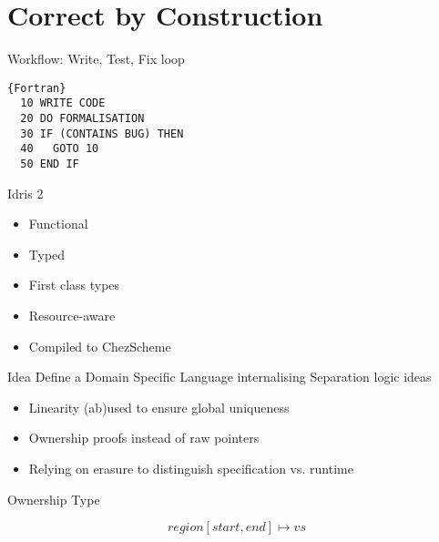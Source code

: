 \section{Correct by Construction}

\newcommand{\mathidris}[1]{{\bf{\mathtt{#1}}}}

\begin{frame}[fragile]{Workflow: Write, Test, Fix loop}

\begin{lstlisting}{Fortran}
  10 WRITE CODE
  20 DO FORMALISATION
  30 IF (CONTAINS BUG) THEN
  40   GOTO 10
  50 END IF
\end{lstlisting}

\end{frame}

\begin{frame}{Idris 2}
  \begin{itemize}
    \item Functional
    \item Typed
    \item First class types
    \item Resource-aware
    \item Compiled to ChezScheme
  \end{itemize}
\end{frame}


\begin{frame}{Idea}
  Define a Domain Specific Language internalising
  Separation logic ideas

  \begin{itemize}
    \item Linearity (ab)used to ensure global uniqueness
    \item Ownership proofs instead of raw pointers
    \item Relying on erasure to distinguish specification vs. runtime
  \end{itemize}

\end{frame}

\begin{frame}{Ownership Type}


  $$\mathit{region}[\mathit{start}, \mathit{end}] \mapsto \mathit{vs}$$


\end{frame}

\newcommand{\listappend}{\mathop{+\!\!\!+}}

